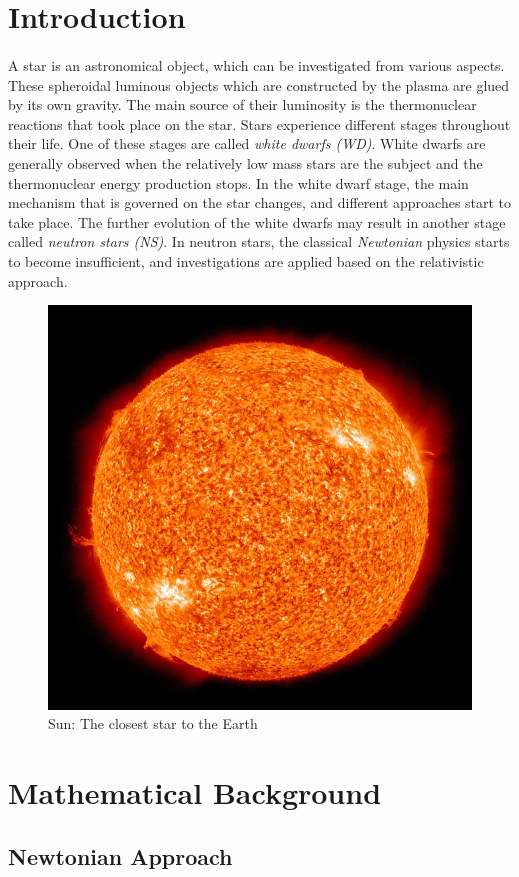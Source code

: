 \documentclass[letterpaper,12pt]{article}
\begin{document}
\section{Introduction}
\paragraph{} A star is an astronomical object, which can be investigated from various aspects. These spheroidal luminous objects which are constructed by the plasma are glued by its own gravity. The main source of their luminosity is the thermonuclear reactions that took place on the star. Stars experience different stages throughout their life. One of these stages are called \textit{white dwarfs (WD)}. White dwarfs are generally observed when the relatively low mass stars are the subject and the thermonuclear energy production stops. In the white dwarf stage, the main mechanism that is governed on the star changes, and different approaches start to take place. The further evolution of the white dwarfs may result in another stage called \textit{neutron stars (NS)}. In neutron stars, the classical \textit{Newtonian} physics starts to become insufficient, and investigations are applied based on the relativistic approach.

\begin{figure}[H] 
\centering \includegraphics[width=0.5\columnwidth]{figures/sun.jpg}           
\caption{Sun: The closest star to the Earth}                
\label{fig:label}
\end{figure}


\section{Mathematical Background}
\label{sec:math}
\subsection{Newtonian Approach}
\end{document}
